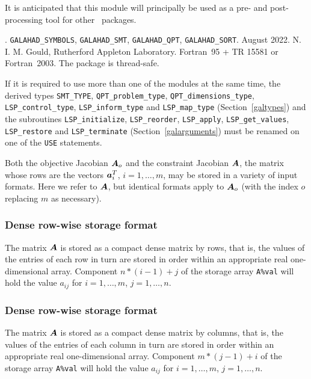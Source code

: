 \documentclass{galahad}
\newcommand{\packagename}{LSP}
\newcommand{\fullpackagename}{\libraryname\_\packagename}
\begin{document}
It is anticipated that this module will principally be used as a pre- and 
post-processing tool for other \galahad\ packages.


\galattributes
\galversions{\tt  \fullpackagename\_single, \fullpackagename\_double}.
\galuses
{\tt GALAHAD\_SY\-M\-BOLS}, 
{\tt GALAHAD\_SMT}, 
{\tt GALAHAD\_QPT},
{\tt GALAHAD\_SORT}.
\galdate August 2022.
\galorigin N. I. M. Gould, Rutherford Appleton Laboratory.
\gallanguage Fortran~95 + TR 15581 or Fortran~2003. 
The package is thread-safe.


\galhowto



\noindent
If it is required to use more than one of the modules at the same time, 
the derived types
{\tt SMT\_TYPE},
{\tt QPT\_problem\_type},
{\tt QPT\_dimensions\_type}, 
{\tt \packagename\_control\_type}, 
\sloppy
{\tt \packagename\_inform\_type} 
and
{\tt \packagename\_map\_type}
(Section~\ref{galtypes})
and the subroutines
{\tt \packagename\_initialize}, 
{\tt \packagename\_reorder},
{\tt \packagename\_apply}, 
{\tt \packagename\_get\_values}, 
{\tt \packagename\_restore}
and
{\tt \packagename\_terminate} 
(Section~\ref{galarguments})
must be renamed on one of the {\tt USE} statements.


\galmatrix

Both the objective Jacobian ${\bm{A}}_o$ and
the constraint Jacobian ${\bm{A}}$, the matrix 
whose rows are the vectors ${\bm{a}}_{i}^{T}$, $i = 1, \ldots , m$, 
may be stored in a variety of input formats. Here we refer to ${\bm{A}}$, but
identical formats apply to ${\bm{A}}_o$ (with the index $o$ replacing $m$ as
necessary).

\subsubsection{Dense row-wise storage format}\label{dense}
The matrix ${\bm{A}}$ is stored as a compact 
dense matrix by rows, that is, the values of the entries of each row in turn are
stored in order within an appropriate real one-dimensional array.
Component $n \ast (i-1) + j$ of the storage array {\tt A\%val} will hold the 
value $a_{ij}$ for $i = 1, \ldots , m$, $j = 1, \ldots , n$.

\subsubsection{Dense row-wise storage format}\label{densecolwise}
The matrix ${\bm{A}}$ is stored as a compact 
dense matrix by columns, that is, the values of the entries of each column 
in turn are stored in order within an appropriate real one-dimensional array.
Component $m \ast (j-1) + i$ of the storage array {\tt A\%val} will hold the 
value $a_{ij}$ for $i = 1, \ldots , m$, $j = 1, \ldots , n$.
\end{document}
